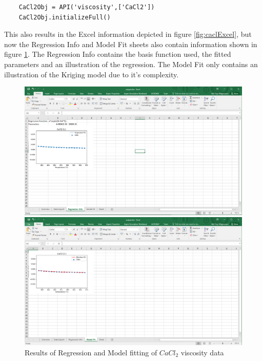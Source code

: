 \begin{verbatim}
    CaCl2Obj = API('viscosity',['CaCl2'])
    CaCl2Obj.initializeFull()
\end{verbatim}
This also results in the Excel information depicted in figure \ref{fig:caclExcel}, but now the Regression Info and Model Fit sheets also contain information shown in figure \ref{fig:caclFits}. The Regression Info contains the basis function used, the fitted parameters and an illustration of the regression. The Model Fit only contains an illustration of the Kriging model due to it's complexity. 


\begin{figure}[h]
\centering
\begin{minipage}{0.5\textwidth}
  \centering
  \includegraphics[width=\linewidth]{msdf/figures/caclRegression.PNG}
\end{minipage}%
\begin{minipage}{0.5\textwidth}
  \centering
  \includegraphics[width=\linewidth]{msdf/figures/caclBlackBox.PNG}
\end{minipage}
\caption{Results of Regression and Model fitting of $CaCl_2$ viscosity data}
\label{fig:caclFits}
\end{figure}


